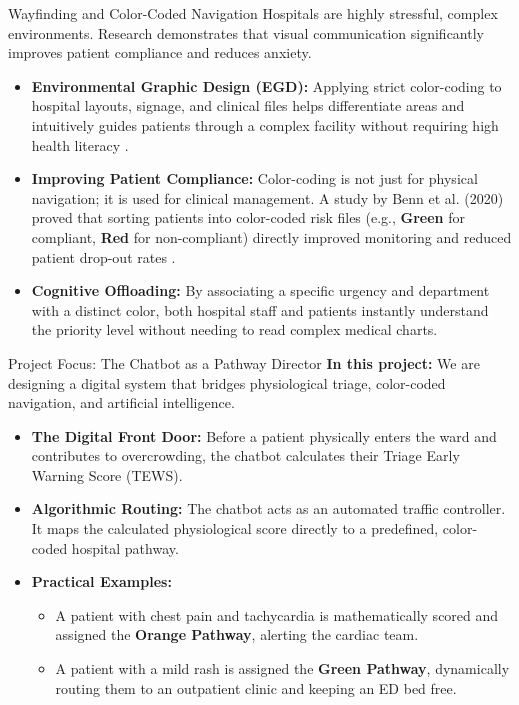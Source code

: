 \documentclass[aspectratio=169]{beamer}
\begin{document}
	\begin{frame}{Wayfinding and Color-Coded Navigation}
		Hospitals are highly stressful, complex environments. Research demonstrates that visual communication significantly improves patient compliance and reduces anxiety.
		\vspace{0.2cm}
		\begin{itemize}
			\item \textbf{Environmental Graphic Design (EGD):} Applying strict color-coding to hospital layouts, signage, and clinical files helps differentiate areas and intuitively guides patients through a complex facility without requiring high health literacy \cite{Dwiputri2019}.
			\item \textbf{Improving Patient Compliance:} Color-coding is not just for physical navigation; it is used for clinical management. A study by Benn et al. (2020) proved that sorting patients into color-coded risk files (e.g., \textcolor{triagegreen}{\textbf{Green}} for compliant, \textcolor{triagered}{\textbf{Red}} for non-compliant) directly improved monitoring and reduced patient drop-out rates \cite{Benn2020}.
			\item \textbf{Cognitive Offloading:} By associating a specific urgency and department with a distinct color, both hospital staff and patients instantly understand the priority level without needing to read complex medical charts.
		\end{itemize}
	\end{frame}
	
	\begin{frame}{Project Focus: The Chatbot as a Pathway Director}
		\textbf{In this project:} We are designing a digital system that bridges physiological triage, color-coded navigation, and artificial intelligence.
		\vspace{0.2cm}
		\begin{itemize}
			\item \textbf{The Digital Front Door:} Before a patient physically enters the ward and contributes to overcrowding, the chatbot calculates their Triage Early Warning Score (TEWS).
			\item \textbf{Algorithmic Routing:} The chatbot acts as an automated traffic controller. It maps the calculated physiological score directly to a predefined, color-coded hospital pathway.
			\item \textbf{Practical Examples:} 
			\begin{itemize}
				\item A patient with chest pain and tachycardia is mathematically scored and assigned the \textcolor{triageorange}{\textbf{Orange Pathway}}, alerting the cardiac team.
				\item A patient with a mild rash is assigned the \textcolor{triagegreen}{\textbf{Green Pathway}}, dynamically routing them to an outpatient clinic and keeping an ED bed free.
			\end{itemize}
		\end{itemize}
	\end{frame}
	
\end{document}
